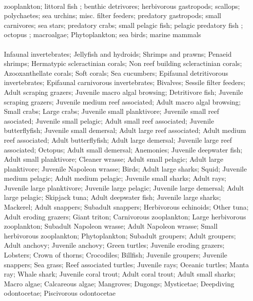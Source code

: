 \fullhline
\hline
{} \\
\hline
zooplankton; littoral fish ; benthic detrivores; herbivorous gastropods; scallops; polychaetes; sea urchins; misc. filter feeders; predatory gastropods; small carnivores; sea stars; predatory crabs; small pelagic fish; pelagic predatory fish ; octopus ; macroalgae; Phytoplankton; sea birds; marine mammals\\
\fullhline
\hline
{} \\
\hline
Infaunal invertebrates; Jellyfish and hydroids; Shrimps and prawns; Penaeid shrimps; Hermatypic scleractinian corals; Non reef building scleractinian corals; Azooxanthellate corals; Soft corals; Sea cucumbers; Epifaunal detritivorous invertebrates; Epifaunal carnivorous invertebrates; Bivalves; Sessile filter feeders; Adult scraping grazers; Juvenile macro algal browsing; Detritivore fish; Juvenile scraping grazers; Juvenile medium reef associated; Adult macro algal browsing; Small crabs; Large crabs; Juvenile small planktivore; Juvenile small reef asociated; Juvenile small pelagic; Adult small reef associated; Juvenile butterflyfish; Juvenile small demersal; Adult large reef associated; Adult medium reef associated; Adult butterflyfish; Adult large demersal; Juvenile large reef associated; Octopus; Adult small demersal; Anemonies; Juvenile deepwater fish; Adult small planktivore; Cleaner wrasse; Adult small pelagic; Adult large planktivore; Juvenile Napoleon wrasse; Birds; Adult large sharks; Squid; Juvenile medium pelagic; Adult medium pelagic; Juvenile small sharks; Adult rays; Juvenile large planktivore; Juvenile large pelagic; Juvenile large demersal; Adult large pelagic; Skipjack tuna; Adult deepwater fish; Juvenile large sharks; Mackerel; Adult snappers; Subadult snappers; Herbivorous echinoids; Other tuna; Adult eroding grazers; Giant triton; Carnivorous zooplankton; Large herbivorous zooplankton; Subadult Napoleon wrasse; Adult Napoleon wrasse; Small herbivorous zooplankton; Phytoplankton; Subadult groupers; Adult groupers; Adult anchovy; Juvenile anchovy; Green turtles; Juvenile eroding grazers; Lobsters; Crown of thorns; Crocodiles; Billfish; Juvenile groupers; Juvenile snappers; Sea grass; Reef associated turtles; Juvenile rays; Oceanic turtles; Manta ray; Whale shark; Juvenile coral trout; Adult coral trout; Adult small sharks; Macro algae; Calcareous algae; Mangroves; Dugongs; Mysticetae; Deepdiving odontocetae; Piscivorous odontocetae\\
